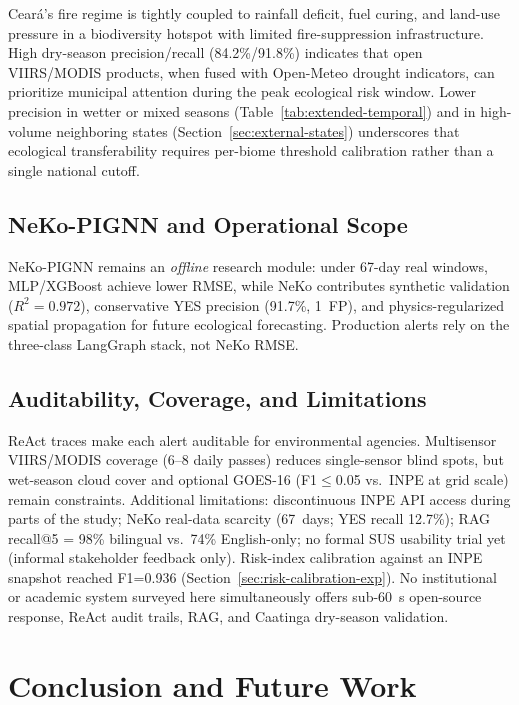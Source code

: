 \documentclass[preprint,12pt,times,numbers]{elsarticle}
\begin{document}
Ceará's fire regime is tightly coupled to rainfall deficit, fuel curing, and land-use pressure in a biodiversity hotspot with limited fire-suppression infrastructure. High dry-season precision/recall (84.2\%/91.8\%) indicates that open VIIRS/MODIS products, when fused with Open-Meteo drought indicators, can prioritize municipal attention during the peak ecological risk window. Lower precision in wetter or mixed seasons (Table~\ref{tab:extended-temporal}) and in high-volume neighboring states (Section~\ref{sec:external-states}) underscores that ecological transferability requires per-biome threshold calibration rather than a single national cutoff.

\subsection{NeKo-PIGNN and Operational Scope}

NeKo-PIGNN remains an \emph{offline} research module: under 67-day real windows, MLP/XGBoost achieve lower RMSE, while NeKo contributes synthetic validation ($R^2=0.972$), conservative YES precision (91.7\%, 1~FP), and physics-regularized spatial propagation for future ecological forecasting. Production alerts rely on the three-class LangGraph stack, not NeKo RMSE.

\subsection{Auditability, Coverage, and Limitations}

ReAct traces make each alert auditable for environmental agencies. Multisensor VIIRS/MODIS coverage (6--8 daily passes) reduces single-sensor blind spots, but wet-season cloud cover and optional GOES-16 (F1$\leq$0.05 vs.\ INPE at grid scale) remain constraints. Additional limitations: discontinuous INPE API access during parts of the study; NeKo real-data scarcity (67~days; YES recall 12.7\%); RAG recall@5 = 98\% bilingual vs.\ 74\% English-only; no formal SUS usability trial yet (informal stakeholder feedback only). Risk-index calibration against an INPE snapshot reached F1=0.936 (Section~\ref{sec:risk-calibration-exp}). No institutional or academic system surveyed here simultaneously offers sub-60~s open-source response, ReAct audit trails, RAG, and Caatinga dry-season validation.

\section{Conclusion and Future Work}
\label{sec:conclusion}
\end{document}
